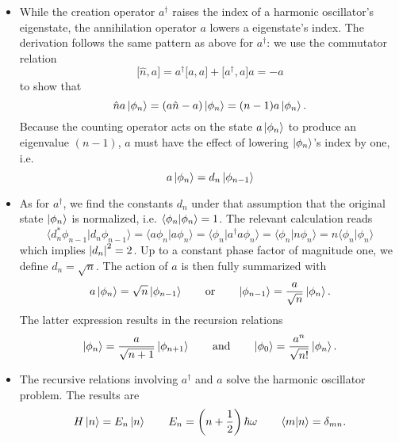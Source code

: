 \documentclass[11pt, a4paper]{article}
\newcommand{\eqtext}[1]{\qquad \text{#1} \qquad}
\newcommand{\bbraket}[2]{\big \langle {#1} \big | {#2} \big \rangle}  %
\renewcommand{\k}[1]{\ket{#1}}
\begin{document}
\begin{itemize}
	\item While the creation operator $ a^{\dagger} $ raises the index of a harmonic oscillator's eigenstate, the annihilation operator $ a $ lowers a eigenstate's index. The derivation follows the same pattern as above for $ a^{\dagger} $: we use the commutator relation
	\begin{equation*}
		\big[\hat{n}, a\big] = a^{\dagger}\big[a, a\big] + \big[a^{\dagger}, a\big]a = - a
	\end{equation*}
	to show that
	\begin{equation*}
		\hat{n}a \ket{\phi_{n}} = (a \hat{n} - a)\ket{\phi_{n}} = (n-1)a\ket{\phi_{n}}.
	\end{equation*}
	Because the counting operator acts on the state $ a\k{\phi_{n}} $ to produce an eigenvalue $ (n-1) $, $ a $ must have the effect of lowering $ \ket{\phi_{n}} $'s index by one, i.e.
	\begin{equation*}
		a\ket{\phi_{n}} = d_{n}\ket{\phi_{n-1}}
	\end{equation*}
	
	\item As for $ a^{\dagger} $, we find the constants $ d_{n} $ under that assumption that the original state $ \ket{\phi_{n}} $ is normalized, i.e. $ \braket{\phi_{n}}{\phi_{n}} = 1 $. The relevant calculation reads
 	\begin{equation*}
 		\bbraket{d_{n}^{*}\phi_{n-1}}{d_{n}\phi_{n-1}} = \bbraket{a\phi_{n}}{a\phi_{n}} = \bbraket{\phi_{n}}{a^{\dagger}a\phi_{n}} = \bbraket{\phi_{n}}{n\phi_{n}} = n \bbraket{\phi_{n}}{\phi_{n}}
 	\end{equation*}
 	which implies $ \abs{d_{n}}^{2} = 2 $. Up to a constant phase factor of magnitude one, we define $ d_{n} = \sqrt{n} $. The action of $ a $ is then fully summarized with
 	\begin{equation*}
 		a\k{\phi_{n}} = \sqrt{n}\ket{\phi_{n-1}} \eqtext{or} \ket{\phi_{n - 1}} = \frac{a}{\sqrt{n}}\k{\phi_{n}}. 
 	\end{equation*}
 	The latter expression results in the recursion relations
 	\begin{equation*}
 		\ket{\phi_{n}} = \frac{a}{\sqrt{n+1}}\ket{\phi_{n+1}} \eqtext{and} \ket{\phi_{0}} = \frac{a^{n}}{\sqrt{n!}}\ket{\phi_{n}}.
 	\end{equation*}
 	
 	\item The recursive relations involving $ a^{\dagger} $  and $ a $ solve the harmonic oscillator problem. The results are
 	\begin{equation*}
 		H\ket{n} = E_{n}\ket{n} \qquad E_{n} = \left(n + \frac{1}{2}\right)\hbar \omega \qquad \braket{m}{n} = \delta_{mn}.
 	\end{equation*}
	 
\end{itemize}
\end{document}
